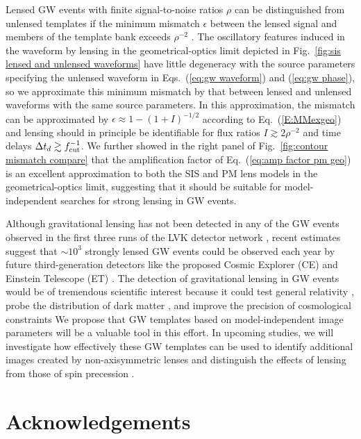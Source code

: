 \documentclass[floats,floatfix,showpacs,amssymb,prd,twocolumn,superscriptaddress,nofootinbib,nolongbibliography,reprint]{revtex4-2}
\begin{document}
Lensed GW events with finite signal-to-noise ratios $\rho$ can be distinguished from unlensed templates if the minimum mismatch $\epsilon$ between the lensed signal and members of the template bank exceeds $\rho^{-2}$ \cite{1992PhRvD..46.5236F,1993PhRvD..47.2198F,PhysRevD.49.2658}.  The oscillatory features induced in the waveform by lensing in the geometrical-optics limit depicted in Fig.~\ref{fig:sis lensed and unlensed waveforms} have little degeneracy with the source parameters specifying the unlensed waveform in Eqs.~(\ref{eq:gw waveform}) and (\ref{eq:gw phase}), so we approximate this minimum mismatch by that between lensed and unlensed waveforms with the same source parameters.  In this approximation, the mismatch can be approximated by $\epsilon \approx 1 - (1 + I)^{-1/2}$ according to Eq.~(\ref{E:MMexgeo}) and lensing should in principle be identifiable for flux ratios $I \gtrsim 2\rho^{-2}$ and time delays $\Delta t_d \gtrsim f_{\rm cut}^{-1}$.  We further showed in the right panel of Fig.~\ref{fig:contour mismatch compare} that the amplification factor of Eq.~(\ref{eq:amp factor pm geo}) is an excellent approximation to both the SIS and PM lens models in the geometrical-optics limit, suggesting that it should be suitable for model-independent searches for strong lensing in GW events.

Although gravitational lensing has not been detected in any of the GW events observed in the first three runs of the LVK detector network \cite{abbott2021search}, recent estimates \cite{2018-oguri} suggest that $\sim 10^3$ strongly lensed GW events could be observed each year by future third-generation detectors like the proposed Cosmic Explorer (CE) \cite{evans2021horizon} and Einstein Telescope (ET) \cite{Maggiore:2019uih}. The detection of gravitational lensing in GW events would be of tremendous scientific interest because it could test general relativity \cite{Baker:2016reh, Collett:2016dey, Mukherjee:2019wcg}, probe the distribution of dark matter \cite{PhysRevD.106.023018, 2022A&A...659L...5C}, and improve the precision of cosmological constraints \cite{PhysRevD.103.024038} We propose that GW templates based on model-independent image parameters will be a valuable tool in this effort.  In upcoming studies, we will investigate how effectively these GW templates can be used to identify additional images created by non-axisymmetric lenses \cite{SIEinprep} and distinguish the effects of lensing from those of spin precession \cite{LensVsPrecinprep}. 

\section*{\label{sec:Acknowledgement}Acknowledgements}
\end{document}
